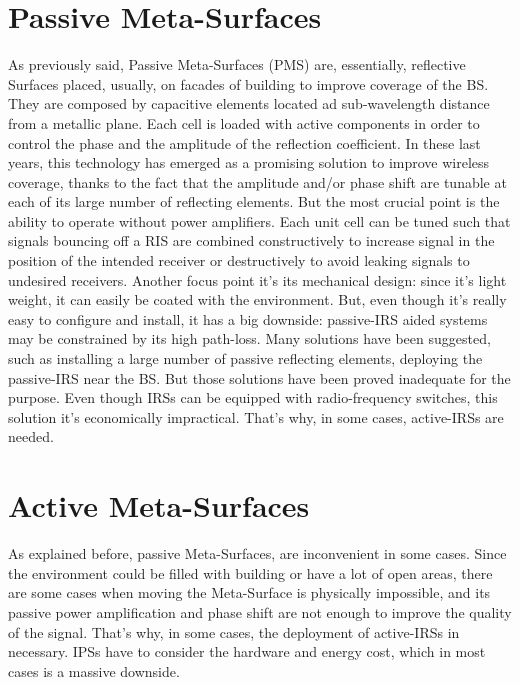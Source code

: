 \section{Passive Meta-Surfaces}
\label{sec:passive-meta-surfaces}
As previously said, Passive Meta-Surfaces (PMS) are, essentially, reflective Surfaces placed, usually, on facades of building to improve coverage of the BS. They are composed by capacitive elements located ad sub-wavelength distance from a metallic plane. Each cell is loaded with active components in order to control the phase and the amplitude of the reflection coefficient. In these last years, this technology has emerged as a promising solution to improve wireless coverage, thanks to the fact that the amplitude and/or phase shift are tunable at each of its large number of reflecting elements. But the most crucial point is the ability to operate without power amplifiers. Each unit cell can be tuned such that signals bouncing off a RIS are combined constructively to increase signal in the position of the intended receiver or destructively to avoid leaking signals to undesired receivers. Another focus point it’s its mechanical design: since it’s light weight, it can easily be coated with the environment. But, even though it’s really easy to configure and install, it has a big downside: passive-IRS aided systems may be constrained by its high path-loss. Many solutions have been suggested, such as installing a large number of passive reflecting elements, deploying the passive-IRS near the BS. But those solutions have been proved inadequate for the purpose. Even though IRSs can be equipped with radio-frequency switches, this solution it’s economically impractical. That’s why, in some cases, active-IRSs are needed. 
\section{Active Meta-Surfaces}
\label{sec:active-meta-surfaces}
As explained before, passive Meta-Surfaces, are inconvenient in some cases. Since the environment could be filled with building or have a lot of open areas, there are some cases when moving the Meta-Surface is physically impossible, and its passive power amplification and phase shift are not enough to improve the quality of the signal. That’s why, in some cases, the deployment of active-IRSs in necessary. IPSs have to consider the hardware and energy cost, which in most cases is a massive downside.